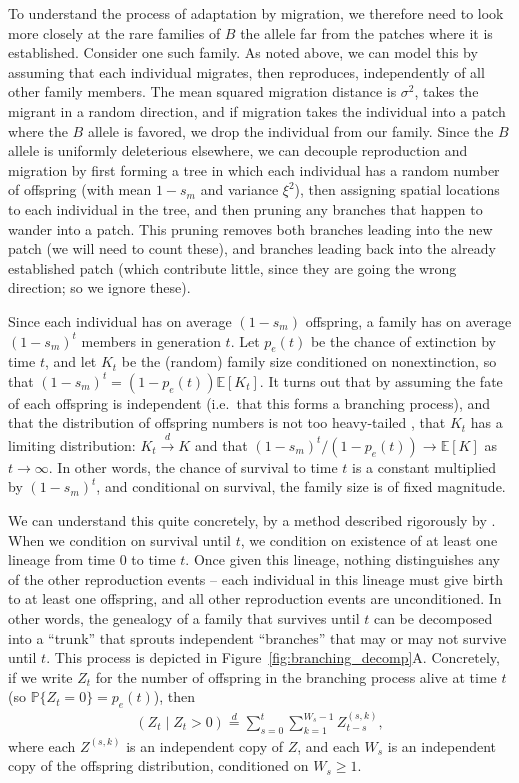 \documentclass{article}
\renewcommand{\P}{\mathbb{P}}
\newcommand{\E}{\mathbb{E}}
\newcommand{\dconv}{\xrightarrow{d}}
\newcommand{\deq}{\stackrel{\scriptscriptstyle{d}}{=}}
\begin{document}
To understand the process of adaptation by migration,
we therefore need to look more closely at the rare families of $B$ the allele far from the patches where it is established.
Consider one such family.
As noted above, we can model this by assuming that each individual
migrates, then reproduces, independently of all other family members.
The mean squared migration distance is $\sigma^2$, takes the migrant in a random direction,
and if migration takes the individual into a patch where the $B$ allele is favored, 
we drop the individual from our family.
Since the $B$ allele is uniformly deleterious elsewhere,
we can decouple reproduction and migration
by first forming a tree in which each individual has a random number of offspring
(with mean $1-s_m$ and variance $\xi^2$),
then assigning spatial locations to each individual in the tree,
and then pruning any branches that happen to wander into a patch.
This pruning removes both 
branches leading into the new patch (we will need to count these),
and branches leading back into the already established patch 
(which contribute little, since they are going the wrong direction;
so we ignore these).  %

Since each individual has on average $(1-s_m)$ offspring,
a family has on average $(1-s_m)^t$ members in generation $t$.
Let $p_e(t)$ be the chance of extinction by time $t$, and let $K_t$ be the (random) family size conditioned on nonextinction,
so that $(1-s_m)^t = (1-p_e(t))\E[K_t]$.
It turns out that by assuming the fate of each offspring is independent (i.e.\ that this forms a branching process),
and that the distribution of offspring numbers is not too heavy-tailed \citep[see][for details]{jagers1975branching},
that $K_t$ has a limiting distribution: $K_t \dconv K$ 
and that $(1-s_m)^{t}/(1-p_e(t)) \to \E[K]$ as $t \to \infty$.
In other words, the chance of survival to time $t$ is a constant multiplied by $(1-s_m)^t$,
and conditional on survival, the family size is of fixed magnitude.

We can understand this quite concretely, by a method described rigorously by \citet{geiger1999elementary}.
When we condition on survival until $t$, we condition on existence of at least one lineage from time $0$ to time $t$.
Once given this lineage, nothing distinguishes any of the other reproduction events --
each individual in this lineage must give birth to at least one offspring,
and all other reproduction events are unconditioned.
In other words, the genealogy of a family that survives until $t$
can be decomposed into a ``trunk'' that 
sprouts independent ``branches'' that may or may not survive until $t$.
This process is depicted in Figure~\ref{fig:branching_decomp}A.
Concretely, if we write $Z_t$ for the number of offspring in the branching process alive at time $t$
(so $\P\{Z_t = 0\} = p_e(t)$),
then
\begin{align}
  \left( Z_t \; \vert \; Z_t>0 \right) \deq \sum_{s=0}^t \sum_{k=1}^{W_s-1} Z^{(s,k)}_{t-s},
\end{align}
where each $Z^{(s,k)}$ is an independent copy of $Z$,
and each $W_s$ is an independent copy of the offspring distribution, conditioned on $W_s \ge 1$.
\end{document}

